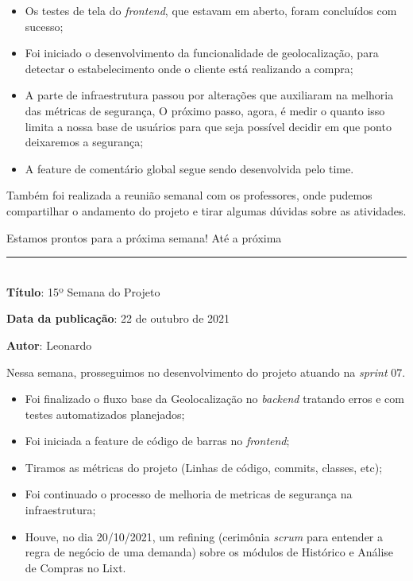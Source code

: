 \begin{itemize}
	\item Os testes de tela do \textit{\gls{frontend}}, que estavam em aberto, foram concluídos com sucesso;
	\item Foi iniciado o desenvolvimento da funcionalidade de geolocalização, para detectar o estabelecimento onde o cliente está realizando a compra; 
	\item A parte de infraestrutura passou por alterações que auxiliaram na melhoria das métricas de segurança, O próximo passo, agora, é medir o quanto isso limita a nossa base de usuários para que seja possível decidir em que ponto deixaremos a segurança; 
	\item A feature de comentário global segue sendo desenvolvida pelo time.
\end{itemize}

Também foi realizada a reunião semanal com os professores, onde pudemos compartilhar o andamento do projeto e tirar algumas dúvidas sobre as atividades. 

Estamos prontos para a próxima semana! Até a próxima \\

\protect\rule{13cm}{.5pt}
\\

\textbf{Título}: 15º Semana do Projeto

\textbf{Data da publicação}: 22 de outubro de 2021

\textbf{Autor}: Leonardo

Nessa semana, prosseguimos no desenvolvimento do projeto atuando na \textit{\gls{sprint}} 07.

\begin{itemize}
	\item Foi finalizado o fluxo base da Geolocalização no \textit{\gls{backend}} tratando erros e com testes automatizados planejados;
	\item Foi iniciada a feature de código de barras no \textit{\gls{frontend}};
	\item Tiramos as métricas do projeto (Linhas de código, commits, classes, etc);
	\item Foi continuado o processo de melhoria de metricas de segurança na infraestrutura;
	\item Houve, no dia 20/10/2021, um refining (cerimônia \textit{\gls{scrum}} para entender a regra de negócio de uma demanda) sobre os módulos de Histórico e Análise de Compras no Lixt.
\end{itemize}

